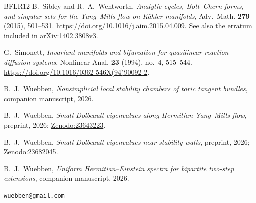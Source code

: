 \documentclass[11pt]{amsart}
\theoremstyle{definition}
\theoremstyle{remark}
\begin{document}
\begin{thebibliography}{BFLR12}
 B.~Sibley and R.~A.~Wentworth, \emph{Analytic cycles, Bott--Chern forms, and singular sets for the Yang--Mills flow on K\"ahler manifolds}, Adv.\ Math. \textbf{279} (2015), 501--531. \url{https://doi.org/10.1016/j.aim.2015.04.009}. See also the erratum included in arXiv:1402.3808v3.

 G.~Simonett, \emph{Invariant manifolds and bifurcation for quasilinear reaction-diffusion systems}, Nonlinear Anal. \textbf{23} (1994), no.~4, 515--544. \url{https://doi.org/10.1016/0362-546X(94)90092-2}.

B.~J.~Wuebben, \emph{Nonsimplicial local stability chambers of toric tangent bundles}, companion manuscript, 2026.

 B.~J.~Wuebben, \emph{Small Dolbeault eigenvalues along Hermitian Yang--Mills flow}, preprint, 2026; \href{https://doi.org/10.5281/zenodo.23643223}{Zenodo:23643223}.

 B.~J.~Wuebben, \emph{Small Dolbeault eigenvalues near stability walls}, preprint, 2026; \href{https://doi.org/10.5281/zenodo.23682045}{Zenodo:23682045}.

B.~J.~Wuebben, \emph{Uniform Hermitian--Einstein spectra for bipartite two-step extensions}, companion manuscript, 2026.
\end{thebibliography}

\bigskip
{} \texttt{wuebben@gmail.com}
\end{document}
